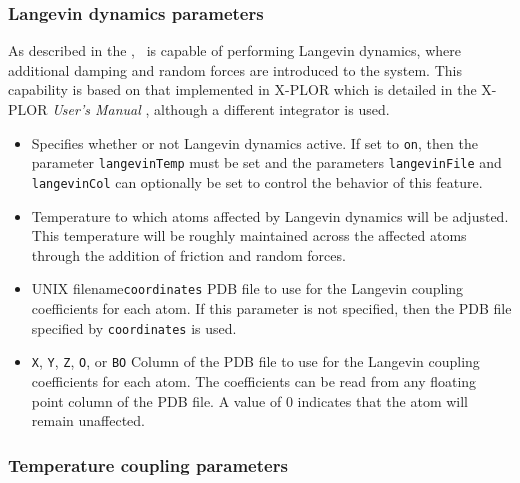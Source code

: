 \subsubsection{Langevin dynamics parameters}

As described in the \PG, \NAMD\ is capable
of performing Langevin dynamics, where additional damping and
random forces are introduced to the system.  This capability
is based on that implemented in X-PLOR which is detailed
in the X-PLOR {\it User's Manual} ,
although a different integrator is used.

\begin{itemize}

\item
{}
{Specifies whether or not Langevin dynamics active.  
If set to \verb!on!, then the parameter \verb!langevinTemp! must be set 
and the parameters \verb!langevinFile! and \verb!langevinCol! can
optionally be set to control the behavior of this feature.} 

\item
{}
{Temperature to which atoms affected by Langevin dynamics will be adjusted.  
This temperature will be roughly maintained across the affected atoms 
through the addition of friction and random forces.}

\item
{}%
{UNIX filename}{\verb!coordinates!}
{PDB file to use for the Langevin coupling coefficients for each atom.  
If this parameter is not specified, then 
the PDB file specified by \verb!coordinates! is used.}

\item
{}
{\verb!X!, \verb!Y!, \verb!Z!, \verb!O!, or \verb!B!}{\verb!O!} 
{Column of the PDB file to use for the Langevin coupling coefficients for 
each atom.  The coefficients can be read from any 
floating point column of the PDB file.  
A value of 0 indicates that the atom will remain unaffected.}

\end{itemize}

\subsubsection{Temperature coupling parameters}

